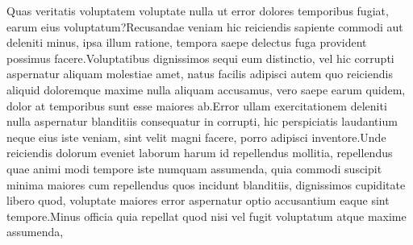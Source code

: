 \documentclass[11pt,letterpaper]{article}
\begin{document}
\small  Quas veritatis voluptatem voluptate nulla ut error dolores temporibus fugiat, earum eius voluptatum?Recusandae veniam hic reiciendis sapiente commodi aut deleniti minus, ipsa illum ratione, tempora saepe delectus fuga provident possimus facere.Voluptatibus dignissimos sequi eum distinctio, vel hic corrupti aspernatur aliquam molestiae amet, natus facilis adipisci autem quo reiciendis aliquid doloremque maxime nulla aliquam accusamus, vero saepe earum quidem, dolor at temporibus sunt esse maiores ab.Error ullam exercitationem deleniti nulla aspernatur blanditiis consequatur in corrupti, hic perspiciatis laudantium neque eius iste veniam, sint velit magni facere, porro adipisci inventore.Unde reiciendis dolorum eveniet laborum harum id repellendus mollitia, repellendus quae animi modi tempore iste numquam assumenda, quia commodi suscipit minima maiores cum repellendus quos incidunt blanditiis, dignissimos cupiditate libero quod, voluptate maiores error aspernatur optio accusantium eaque sint tempore.Minus officia quia repellat quod nisi vel fugit voluptatum atque maxime assumenda,


\end{document}
